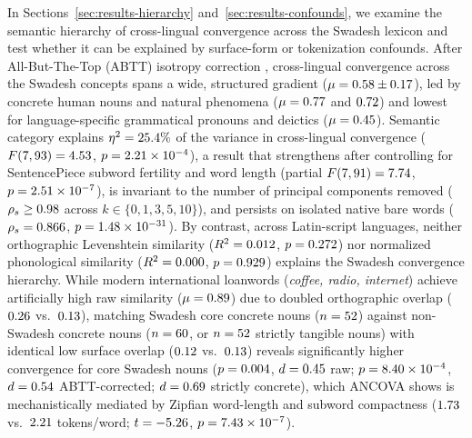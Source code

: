 In Sections~\ref{sec:results-hierarchy} and~\ref{sec:results-confounds}, we examine the semantic hierarchy of cross-lingual convergence across the Swadesh lexicon and test whether it can be explained by surface-form or tokenization confounds.
After All-But-The-Top (ABTT) isotropy correction \citep{mu2018}, cross-lingual convergence across the \NumConcepts{} Swadesh concepts spans a wide, structured gradient ($\mu = 0.58{} \pm 0.17{}$), led by concrete human nouns and natural phenomena ($\mu = 0.77{}$ and $0.72{}$) and lowest for language-specific grammatical pronouns and deictics ($\mu = 0.45{}$).
Semantic category explains $\eta^2 = 25.4{}\%$ of the variance in cross-lingual convergence ($F(7, 93) = 4.53{}$, $p = 2.21 \times 10^{-4}{}$), a result that strengthens after controlling for SentencePiece subword fertility and word length (partial $F(7, 91) = 7.74{}$, $p = 2.51 \times 10^{-7}{}$), is invariant to the number of principal components removed ($\rho_s \ge 0.98{}$ across $k \in \{0, 1, 3, 5, 10\}$), and persists on isolated native bare words ($\rho_s = 0.866{}$, $p = 1.48 \times 10^{-31}{}$).
By contrast, across \DecompNumLatinLangs{} Latin-script languages, neither orthographic Levenshtein similarity ($R^2 = 0.012{}$, $p = 0.272{}$) nor normalized phonological similarity ($R^2 = 0.000{}$, $p = 0.929{}$) explains the Swadesh convergence hierarchy.
While modern international loanwords (\emph{coffee, radio, internet}) achieve artificially high raw similarity ($\mu = 0.89{}$) due to doubled orthographic overlap ($0.26{}$ vs.\ $0.13{}$), matching Swadesh core concrete nouns ($n = 52{}$) against non-Swadesh concrete nouns ($n = 60{}$, or $n = 52{}$ strictly tangible nouns) with identical low surface overlap ($0.12{}$ vs.\ $0.13{}$) reveals significantly higher convergence for core Swadesh nouns ($p = 0.004{}$, $d = 0.45{}$ raw; $p = 8.40 \times 10^{-4}{}$, $d = 0.54{}$ ABTT-corrected; $d = 0.69{}$ strictly concrete), which ANCOVA shows is mechanistically mediated by Zipfian word-length and subword compactness ($1.73{}$ vs.\ $2.21{}$ tokens/word; $t = -5.26{}$, $p = 7.43 \times 10^{-7}{}$).

